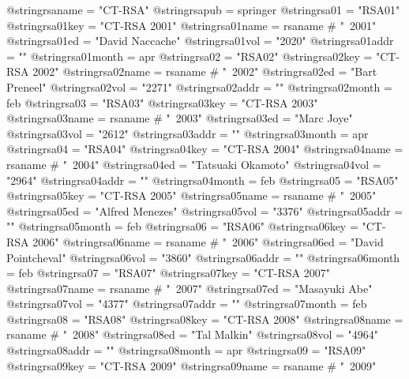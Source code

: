 @string{rsaname =               "CT-RSA"}
@string{rsapub =                springer}
@string{rsa01 =                 "RSA01"}
@string{rsa01key =              "CT-RSA 2001"}
@string{rsa01name =             rsaname # "~2001"}
@string{rsa01ed =               "David Naccache"}
@string{rsa01vol =              "2020"}
@string{rsa01addr =             ""}
@string{rsa01month =            apr}
@string{rsa02 =                 "RSA02"}
@string{rsa02key =              "CT-RSA 2002"}
@string{rsa02name =             rsaname # "~2002"}
@string{rsa02ed =               "Bart Preneel"}
@string{rsa02vol =              "2271"}
@string{rsa02addr =             ""}
@string{rsa02month =            feb}
@string{rsa03 =                 "RSA03"}
@string{rsa03key =              "CT-RSA 2003"}
@string{rsa03name =             rsaname # "~2003"}
@string{rsa03ed =               "Marc Joye"}
@string{rsa03vol =              "2612"}
@string{rsa03addr =             ""}
@string{rsa03month =            apr}
@string{rsa04 =                 "RSA04"}
@string{rsa04key =              "CT-RSA 2004"}
@string{rsa04name =             rsaname # "~2004"}
@string{rsa04ed =               "Tatsuaki Okamoto"}
@string{rsa04vol =              "2964"}
@string{rsa04addr =             ""}
@string{rsa04month =            feb}
@string{rsa05 =                 "RSA05"}
@string{rsa05key =              "CT-RSA 2005"}
@string{rsa05name =             rsaname # "~2005"}
@string{rsa05ed =               "Alfred Menezes"}
@string{rsa05vol =              "3376"}
@string{rsa05addr =             ""}
@string{rsa05month =            feb}
@string{rsa06 =                 "RSA06"}
@string{rsa06key =              "CT-RSA 2006"}
@string{rsa06name =             rsaname # "~2006"}
@string{rsa06ed =               "David Pointcheval"}
@string{rsa06vol =              "3860"}
@string{rsa06addr =             ""}
@string{rsa06month =            feb}
@string{rsa07 =                 "RSA07"}
@string{rsa07key =              "CT-RSA 2007"}
@string{rsa07name =             rsaname # "~2007"}
@string{rsa07ed =               "Masayuki Abe"}
@string{rsa07vol =              "4377"}
@string{rsa07addr =             ""}
@string{rsa07month =            feb}
@string{rsa08 =                 "RSA08"}
@string{rsa08key =              "CT-RSA 2008"}
@string{rsa08name =             rsaname # "~2008"}
@string{rsa08ed =               "Tal Malkin"}
@string{rsa08vol =              "4964"}
@string{rsa08addr =             ""}
@string{rsa08month =            apr}
@string{rsa09 =                 "RSA09"}
@string{rsa09key =              "CT-RSA 2009"}
@string{rsa09name =             rsaname # "~2009"}
